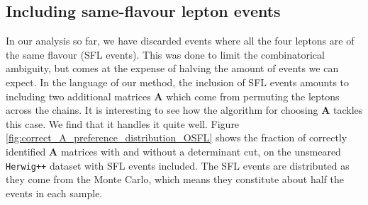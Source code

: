 \documentclass[twoside,english]{uiofysmaster}
\begin{document}
\subsection{Including same-flavour lepton events}
In our analysis so far, we have discarded events where all the four leptons are of the same flavour (SFL events). This was done to limit the combinatorical ambiguity, but comes at the expense of halving the amount of events we can expect. In the language of our method, the inclusion of SFL events amounts to including two additional matrices $\mathbf{A}$ which come from permuting the leptons across the chains. It is interesting to see how the algorithm for choosing $\mathbf{A}$ tackles this case. We find that it handles it quite well. Figure \ref{fig:correct_A_preference_distribution_OSFL} shows the fraction of correctly identified $\mathbf{A}$ matrices with and without a determinant cut, on the unsmeared {\tt Herwig++} dataset with SFL events included. The SFL events are distributed as they come from the Monte Carlo, which means they constitute about half the events in each sample.
\end{document}
